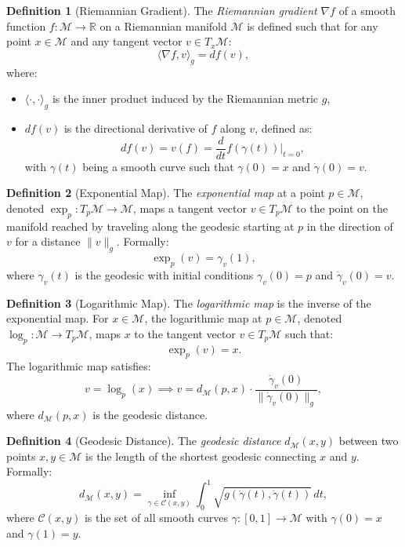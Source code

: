 \documentclass[a4paper,14pt]{article}
\theoremstyle{plain} %
\theoremstyle{definition} %
\theoremstyle{remark} %
\theoremstyle{definition}
\newtheorem{definition}{Definition}[section]
\theoremstyle{remark}
\theoremstyle{remark}
\begin{document}
	\begin{definition}[Riemannian Gradient]
		The \textit{Riemannian gradient} \( \nabla f \) of a smooth function \( f : \mathcal{M} \to \mathbb{R} \) on a Riemannian manifold \( \mathcal{M} \) is defined such that for any point \( x \in \mathcal{M} \) and any tangent vector \( v \in T_x\mathcal{M} \):
		\[
		\langle \nabla f, v \rangle_g = df(v),
		\]
		where:
		\begin{itemize}
			\item \( \langle \cdot, \cdot \rangle_g \) is the inner product induced by the Riemannian metric \( g \),
			\item \( df(v) \) is the directional derivative of \( f \) along \( v \), defined as:
			\[
			df(v) = v(f) = \frac{d}{dt} f(\gamma(t)) \bigg|_{t=0},
			\]
			with \( \gamma(t) \) being a smooth curve such that \( \gamma(0) = x \) and \( \dot{\gamma}(0) = v \).
		\end{itemize}
	\end{definition}
	
	\begin{definition}[Exponential Map]
		The \textit{exponential map} at a point \( p \in \mathcal{M} \), denoted \( \exp_p: T_p\mathcal{M} \to \mathcal{M} \), maps a tangent vector \( v \in T_p\mathcal{M} \) to the point on the manifold reached by traveling along the geodesic starting at \( p \) in the direction of \( v \) for a distance \( \|v\|_g \). Formally:
		\[
		\exp_p(v) = \gamma_v(1),
		\]
		where \( \gamma_v(t) \) is the geodesic with initial conditions \( \gamma_v(0) = p \) and \( \dot{\gamma}_v(0) = v \).
	\end{definition}
	
	\begin{definition}[Logarithmic Map]
		The \textit{logarithmic map} is the inverse of the exponential map. For \( x \in \mathcal{M} \), the logarithmic map at \( p \in \mathcal{M} \), denoted \( \log_p: \mathcal{M} \to T_p\mathcal{M} \), maps \( x \) to the tangent vector \( v \in T_p\mathcal{M} \) such that:
		\[
		\exp_p(v) = x.
		\]
		The logarithmic map satisfies:
		\[
		v = \log_p(x) \implies v = d_\mathcal{M}(p, x) \cdot \frac{\dot{\gamma}_v(0)}{\|\dot{\gamma}_v(0)\|_g},
		\]
		where \( d_\mathcal{M}(p, x) \) is the geodesic distance.
	\end{definition}
	
	\begin{definition}[Geodesic Distance]
		The \textit{geodesic distance} \( d_\mathcal{M}(x, y) \) between two points \( x, y \in \mathcal{M} \) is the length of the shortest geodesic connecting \( x \) and \( y \). Formally:
		\[
		d_\mathcal{M}(x, y) = \inf_{\gamma \in \mathcal{C}(x, y)} \int_0^1 \sqrt{g(\dot{\gamma}(t), \dot{\gamma}(t))} \, dt,
		\]
		where \( \mathcal{C}(x, y) \) is the set of all smooth curves \( \gamma: [0, 1] \to \mathcal{M} \) with \( \gamma(0) = x \) and \( \gamma(1) = y \).
	\end{definition}
	
\end{document}

